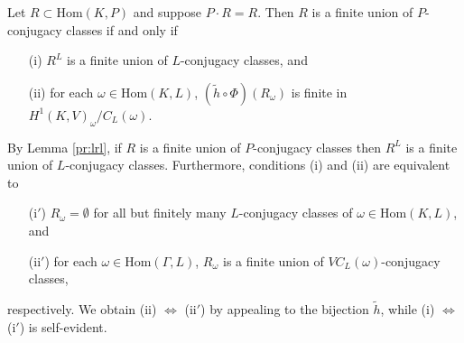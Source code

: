 \begin{theorem}\label{r:finite_p} Let $R \subset \mathrm{Hom}(K, P)$ and suppose $P \cdot R = R$. Then $R$ is a finite union of $P$-conjugacy classes if and only if
	\begin{itemize}
		\item[(i)] $R^L$ is a finite union of $L$-conjugacy classes, and
		\item[(ii)] for each $\omega \in \mathrm{Hom}(K, L)$, $(\widetilde{h} \circ \Phi)(R_\omega)$ is finite in $H^1(K, V)_\omega/C_L(\omega)$.
	\end{itemize}
\end{theorem}
\begin{remark} By Lemma \ref{pr:lrl}, if $R$ is a finite union of $P$-conjugacy classes then $R^L$ is a finite union of $L$-conjugacy classes. Furthermore, conditions (i) and (ii) are equivalent to 
	\begin{itemize}
		\item[(i$'$)] $R_\omega = \emptyset$ for all but finitely many $L$-conjugacy classes of $\omega \in \mathrm{Hom}(K, L)$, and
		\item[(ii$'$)] for each $\omega \in \mathrm{Hom}(\Gamma, L)$, $R_\omega$ is a finite union of $VC_L(\omega)$-conjugacy classes,
	\end{itemize}
	respectively. We obtain (ii) $\Leftrightarrow$ (ii$'$) by appealing to the bijection $\widetilde{h}$, while (i) $\Leftrightarrow$ (i$'$) is self-evident.
\end{remark}
